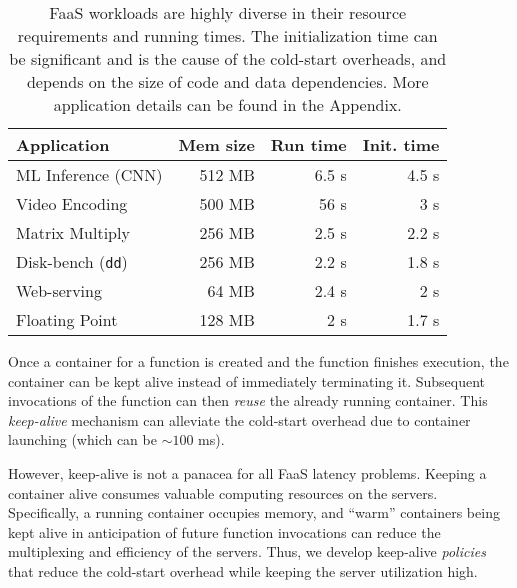 \begin{table}
  \begin{tabular}{lrrr}
    \hline 
    Application & Mem size & Run time & Init. time \\
    \hline
    ML Inference (CNN) & 512 MB & 6.5 s & 4.5 s \\
    Video Encoding & 500 MB & 56 s & 3 s \\
    Matrix Multiply & 256 MB & 2.5 s & 2.2 s \\
    Disk-bench (\texttt{dd})  & 256 MB & 2.2 s & 1.8 s \\
    Web-serving & 64 MB & 2.4 s & 2 s \\
    Floating Point & 128 MB & 2 s & 1.7 s \\

    \hline
  \end{tabular}
  \caption{FaaS workloads are highly diverse in their resource requirements and running times. The initialization time can be significant and is the cause of the cold-start overheads, and depends on the size of code and data dependencies. More application details can be found in the Appendix.}
  \label{tab:workloads}
\end{table}



Once a container for a function is created and the function finishes execution, the container can be kept alive instead of immediately terminating it. 
Subsequent invocations of the function can then \emph{reuse} the already running container.
This \emph{keep-alive} mechanism can alleviate the cold-start overhead due to container launching (which can be $\sim 100$ ms). %



However, keep-alive is not a panacea for all FaaS latency problems. 
Keeping a container alive consumes valuable computing resources on the servers. %
Specifically, a running container occupies memory, and ``warm'' containers being kept alive in anticipation of future function invocations can reduce the multiplexing and efficiency of the servers. 
Thus, we develop keep-alive \emph{policies} that reduce the cold-start overhead while keeping the server utilization high.
%

